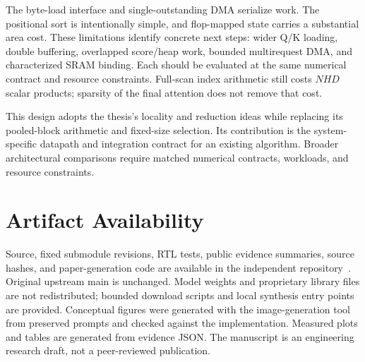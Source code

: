 \documentclass[conference]{IEEEtran}
\begin{document}
The byte-load interface and single-outstanding DMA serialize work. The positional sort is intentionally simple, and flop-mapped state carries a substantial area cost. These limitations identify concrete next steps: wider Q/K loading, double buffering, overlapped score/heap work, bounded multirequest DMA, and characterized SRAM binding. Each should be evaluated at the same numerical contract and resource constraints. Full-scan index arithmetic still costs $NHD$ scalar products; sparsity of the final attention does not remove that cost.

This design adopts the thesis's locality and reduction ideas while replacing its pooled-block arithmetic and fixed-size selection. Its contribution is the system-specific datapath and integration contract for an existing algorithm. Broader architectural comparisons require matched numerical contracts, workloads, and resource constraints.

\section{Artifact Availability}
Source, fixed submodule revisions, RTL tests, public evidence summaries, source hashes, and paper-generation code are available in the independent repository~\cite{artifact}. Original upstream main is unchanged. Model weights and proprietary library files are not redistributed; bounded download scripts and local synthesis entry points are provided. Conceptual figures were generated with the image-generation tool from preserved prompts and checked against the implementation. Measured plots and tables are generated from evidence JSON. The manuscript is an engineering research draft, not a peer-reviewed publication.



\end{document}
